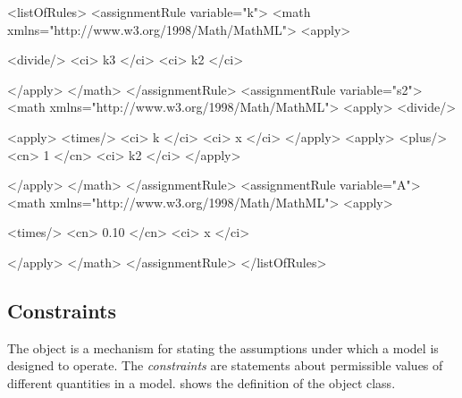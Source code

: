 \begin{example}
<listOfRules>
    <assignmentRule variable="k">
        <math xmlns="http://www.w3.org/1998/Math/MathML">
            <apply>\begin{blockChanged}
                <divide/>
                <ci> k3 </ci>
                <ci> k2 </ci>\end{blockChanged}
            </apply>
        </math>
    </assignmentRule>
    <assignmentRule variable="s2">
        <math xmlns="http://www.w3.org/1998/Math/MathML">
            <apply>
                <divide/>\begin{blockChanged}
                    <apply> 
                        <times/>
                        <ci> k </ci>
                        <ci> x </ci>
                    </apply>
                    <apply> 
                        <plus/>
                        <cn> 1 </cn>
                        <ci> k2 </ci>
                    </apply>\end{blockChanged}
            </apply>
        </math>
    </assignmentRule>
    <assignmentRule variable="A">
        <math xmlns="http://www.w3.org/1998/Math/MathML">
            <apply>\begin{blockChanged}
                <times/>
                <cn> 0.10 </cn>
                <ci> x </ci>\end{blockChanged}
            </apply>
        </math>
    </assignmentRule>
</listOfRules>
\end{example}


\subsection{Constraints}
\label{sec:constraints}

The \Constraint object is a mechanism for stating the
assumptions under which a model is designed to operate.  The
\emph{constraints} are statements about permissible values of
different quantities in a model.  
shows the definition of the \Constraint object class.

